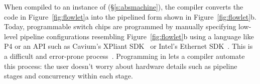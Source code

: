 When compiled to an instance of \absmachine (\S\ref{s:absmachine}), the
\pktlanguage compiler converts the code in Figure~\ref{fig:flowlet}a into the
pipelined form shown in Figure~\ref{fig:flowlet}b. Today, programmable switch
chips are programmed by manually specifying low-level pipeline configurations
resembling Figure~\ref{fig:flowlet}b using a language like P4 or an API such as
Cavium's XPliant SDK~\cite{xpliant_sdk} or Intel's Ethernet
SDK~\cite{intel_sdk}. This is a difficult and error-prone
process~\cite{p4-semantics}.  Programming in \pktlanguage lets a compiler
automate this process: the user doesn't worry about hardware details such as
pipeline stages and concurrency within each stage.
